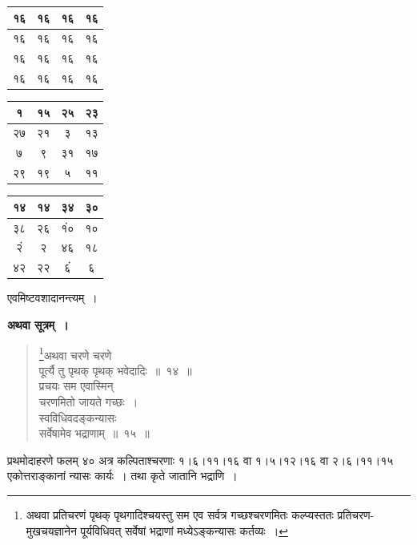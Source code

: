 \documentclass[11pt, openany]{book}
\begin{document}
\begin{table}[h]
\setlength{\extrarowheight}{5pt} \setlength{\tabcolsep}{5pt}
\centering	
\begin{tabular}{|c|c|c|c|}
	\hline
१६ & १६ & १६ & १६\\
\hline
१६ & १६ & १६ & १६\\
\hline
१६ & १६ & १६ & १६\\
\hline
१६ & १६ & १६ & १६\\
\hline
\end{tabular}\qquad
\begin{tabular}{|c|c|c|c|}
	\hline
१ & १५ & २५ & २३\\
\hline
२७ & २१ & ३ & १३\\
\hline
७ & ९ & ३१ & १७\\
\hline
२९ & १९ & ५ & ११\\
\hline
\end{tabular}\qquad
\begin{tabular}{|c|c|c|c|}
	\hline
१४ & १४ & ३४ & ३०\\
\hline
३८ & २६ & १ं० & १०\\
\hline
२ं & २ & ४६ & १८\\
\hline
४२ & २२ & ६ं & ६\\
\hline
\end{tabular}
\end{table}

एवमिष्टवशादानन्त्यम्~।

\newpage

\textbf{अथवा सूत्रम्~।}

\begin{quote}
\renewcommand{\thefootnote}{१}\footnote{अथवा प्रतिचरणं पृथक् पृथगादिश्चयस्तु सम एव सर्वत्र गच्छश्चरणमितः कल्प्यस्ततः प्रतिचरण-मुखचयज्ञानेन पूर्यविधिवत् सर्वेषां भद्राणां मध्येऽङ्कन्यासः कर्तव्यः~।}{\gk अथवा चरणे चरणे\\
पूर्त्यै तु पृथक् पृथक् भवेदादिः~॥~१४~॥\\
प्रचयः सम एवास्मिन्\\
चरणमितो जायते गच्छः~।\\
स्वविधिवदङ्कन्यासः\\
सर्वेषामेव भद्राणाम्~॥~१५~॥	}
\end{quote}

प्रथमोदाहरणे फलम् ४० अत्र कल्पिताश्चरणाः १।६।११।१६ वा १।५।१२।१६ वा २।६।११।१५ एकोत्तराङ्कानां न्यासः कार्यः~। तथा कृते जातानि भद्राणि~।
\end{document}
